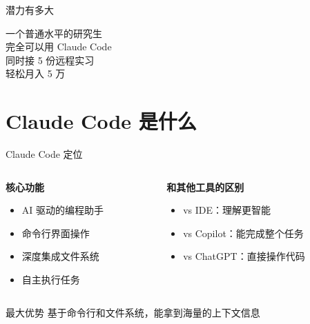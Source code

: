 \documentclass[aspectratio=169,xcolor=dvipsnames]{beamer}
\begin{document}
\begin{frame}{潜力有多大}
  \begin{center}
    \huge
    一个普通水平的研究生\\
    完全可以用 Claude Code\\
    同时接 5 份远程实习\\
    轻松月入 5 万
  \end{center}
\end{frame}

\section{Claude Code 是什么}

\begin{frame}{Claude Code 定位}
  \begin{columns}
    \begin{column}{0.48\textwidth}
      \textbf{核心功能}
      \begin{itemize}
        \item AI 驱动的编程助手
        \item 命令行界面操作
        \item 深度集成文件系统
        \item 自主执行任务
      \end{itemize}
    \end{column}
    \begin{column}{0.48\textwidth}
      \textbf{和其他工具的区别}
      \begin{itemize}
        \item vs IDE：理解更智能
        \item vs Copilot：能完成整个任务
        \item vs ChatGPT：直接操作代码
      \end{itemize}
    \end{column}
  \end{columns}

  \vspace{0.5cm}

  \begin{block}{最大优势}
    基于命令行和文件系统，能拿到海量的上下文信息
  \end{block}
\end{frame}
\end{document}
